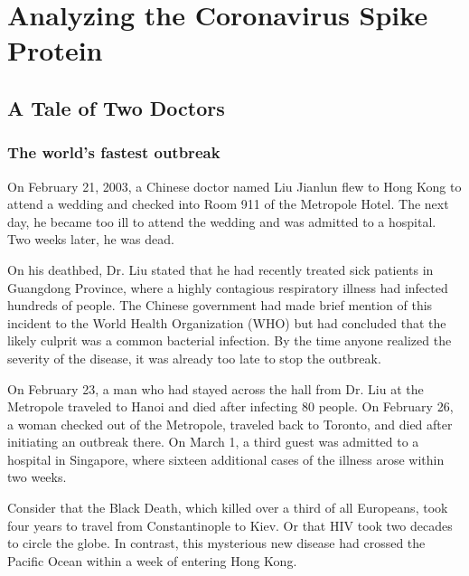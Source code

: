 \chapter[Analyzing the Coronavirus Spike Protein]{Analyzing the Coronavirus Spike Protein}
\label{chapter:coronavirus}
\renewcommand{\chaptertitle}{Analyzing the Coronavirus Spike Protein}

\FloatBarrier

\section{A Tale of Two Doctors}
\label{sec:coronavirus_introduction}

\FloatBarrier
{}
\subsection{The world's fastest outbreak}

On February 21, 2003, a Chinese doctor named Liu Jianlun flew to Hong Kong to attend a wedding and checked into Room 911 of the Metropole Hotel. The next day, he became too ill to attend the wedding and was admitted to a hospital. Two weeks later, he was dead.

On his deathbed, Dr. Liu stated that he had recently treated sick patients in Guangdong Province, where a highly contagious respiratory illness had infected hundreds of people. The Chinese government had made brief mention of this incident to the World Health Organization (WHO) but had concluded that the likely culprit was a common bacterial infection. By the time anyone realized the severity of the disease, it was already too late to stop the outbreak.

On February 23, a man who had stayed across the hall from Dr. Liu at the Metropole traveled to Hanoi and died after infecting 80 people. On February 26, a woman checked out of the Metropole, traveled back to Toronto, and died after initiating an outbreak there. On March 1, a third guest was admitted to a hospital in Singapore, where sixteen additional cases of the illness arose within two weeks.

Consider that the Black Death, which killed over a third of all Europeans, took four years to travel from Constantinople to Kiev. Or that HIV took two decades to circle the globe. In contrast, this mysterious new disease had crossed the Pacific Ocean within a week of entering Hong Kong.

